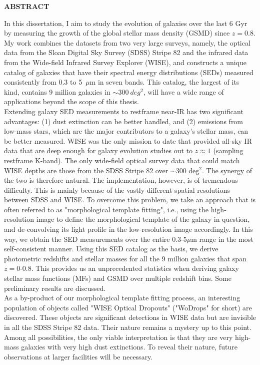 \newpage
{}

\centerline{\bf \large ABSTRACT}
\vspace{10mm} %
In this dissertation, I aim to study the evolution of galaxies over the last 6 Gyr by measuring the growth of the global stellar mass density (GSMD) since $z=0.8$. My work combines the datasets from two very large surveys, namely, the optical data from the Sloan Digital Sky Survey (SDSS) Stripe 82 and the infrared data from the Wide-field Infrared Survey Explorer (WISE), and constructs a unique catalog of galaxies that have their spectral energy distributions (SEDs) measured consistently from 0.3 to 5~$\mu$m in seven bands. This catalog, the largest of its kind, contains 9 million galaxies in $\sim300~deg^2$, will have a wide range of applications beyond the scope of this thesis.\\

Extending galaxy SED measurements to restframe near-IR has two significant advantages: (1) dust extinction can be better handled, and (2) emissions from low-mass stars, which are the major contributors to a galaxy's stellar mass, can be better measured. WISE was the only mission to date that provided all-sky IR data that are deep enough  for galaxy evolution studies out to $z\approx 1$ (sampling restframe K-band). The only wide-field optical survey data that could match WISE depths are those from the SDSS Stripe 82 over $\sim 300$ deg$^2$. The synergy of the two is therefore natural. The implementation, however, is of tremendous difficulty. This is mainly because of the vastly different spatial resolutions between SDSS and WISE. To overcome this problem, we take an approach that is often referred to as "morphological template fitting", i.e., using the high-resolution image to define the morphological template of the galaxy in question, and de-convolving its light profile in the low-resolution image accordingly. In this way, we obtain the SED measurements over the entire 0.3-5$\mu$m range in the most self-consistent manner. Using this SED catalog as the basis, we derive photometric redshifts and stellar masses for all the 9 million galaxies that span $z=0$-0.8. This provides us an unprecedented statistics when deriving galaxy stellar mass functions  (MFs) and GSMD over multiple redshift bins. Some preliminary results are discussed. \\

As a by-product of our morphological template fitting process, an interesting population of objects called "WISE Optical Dropouts" ("WoDrops" for short) are discovered. These objects are significant detections in WISE data but are invisible in all the SDSS Stripe 82 data. Their nature remains a mystery up to this point. Among all possibilities, the only viable interpretation is that they are very high-mass galaxies with very high dust extinctions. To reveal their nature, future observations at larger facilities will be necessary.